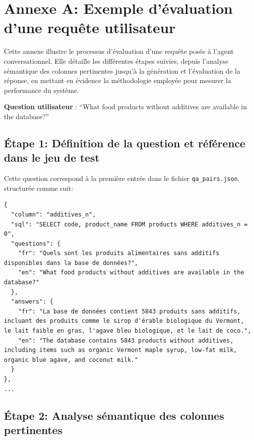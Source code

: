 \documentclass[a4paper,11pt]{article}
\begin{document}
\label{sec:biblio}




\newpage
\section*{Annexe A: Exemple d'évaluation d'une requête utilisateur}

Cette annexe illustre le processus d’évaluation d’une requête posée à l’agent conversationnel. Elle détaille les différentes étapes suivies, depuis l’analyse sémantique des colonnes pertinentes jusqu’à la génération et l’évaluation de la réponse, en mettant en évidence la méthodologie employée pour mesurer la performance du système.

\textbf{Question utilisateur} : 
\enquote{What food products without additives are available in the database?}


\subsection*{Étape 1: Définition de la question et référence dans le jeu de test}

Cette question correspond à la première entrée dans le fichier \texttt{qa\_pairs.json}, structurée comme suit:


\begin{lstlisting}
{
  "column": "additives_n",
  "sql": "SELECT code, product_name FROM products WHERE additives_n = 0",
  "questions": {
    "fr": "Quels sont les produits alimentaires sans additifs disponibles dans la base de données?",
    "en": "What food products without additives are available in the database?"
  },
  "answers": {
    "fr": "La base de données contient 5843 produits sans additifs, incluant des produits comme le sirop d'érable biologique du Vermont, le lait faible en gras, l'agave bleu biologique, et le lait de coco.",
    "en": "The database contains 5843 products without additives, including items such as organic Vermont maple syrup, low-fat milk, organic blue agave, and coconut milk."
  }
},
...
\end{lstlisting}

\subsection*{Étape 2: Analyse sémantique des colonnes pertinentes}
\end{document}
